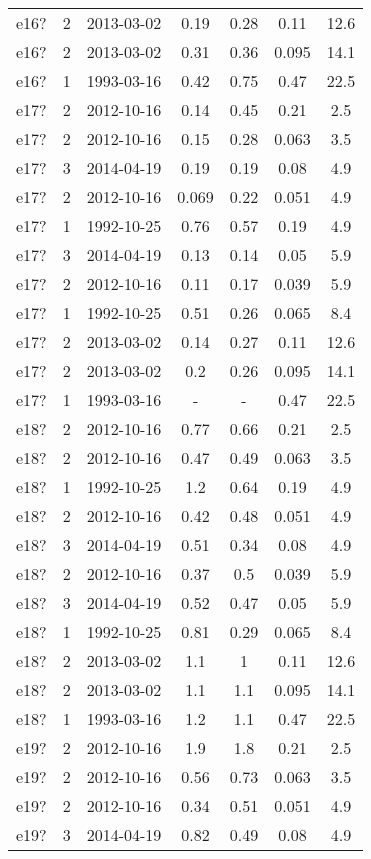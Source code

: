 \begin{longtable}[htp]
\begin{longtable}{ccccccc}
e16? & 2 & 2013-03-02 & 0.19 & 0.28 & 0.11 & 12.6 \\
e16? & 2 & 2013-03-02 & 0.31 & 0.36 & 0.095 & 14.1 \\
e16? & 1 & 1993-03-16 & 0.42 & 0.75 & 0.47 & 22.5 \\
e17? & 2 & 2012-10-16 & 0.14 & 0.45 & 0.21 & 2.5 \\
e17? & 2 & 2012-10-16 & 0.15 & 0.28 & 0.063 & 3.5 \\
e17? & 3 & 2014-04-19 & 0.19 & 0.19 & 0.08 & 4.9 \\
e17? & 2 & 2012-10-16 & 0.069 & 0.22 & 0.051 & 4.9 \\
e17? & 1 & 1992-10-25 & 0.76 & 0.57 & 0.19 & 4.9 \\
e17? & 3 & 2014-04-19 & 0.13 & 0.14 & 0.05 & 5.9 \\
e17? & 2 & 2012-10-16 & 0.11 & 0.17 & 0.039 & 5.9 \\
e17? & 1 & 1992-10-25 & 0.51 & 0.26 & 0.065 & 8.4 \\
e17? & 2 & 2013-03-02 & 0.14 & 0.27 & 0.11 & 12.6 \\
e17? & 2 & 2013-03-02 & 0.2 & 0.26 & 0.095 & 14.1 \\
e17? & 1 & 1993-03-16 & - & - & 0.47 & 22.5 \\
e18? & 2 & 2012-10-16 & 0.77 & 0.66 & 0.21 & 2.5 \\
e18? & 2 & 2012-10-16 & 0.47 & 0.49 & 0.063 & 3.5 \\
e18? & 1 & 1992-10-25 & 1.2 & 0.64 & 0.19 & 4.9 \\
e18? & 2 & 2012-10-16 & 0.42 & 0.48 & 0.051 & 4.9 \\
e18? & 3 & 2014-04-19 & 0.51 & 0.34 & 0.08 & 4.9 \\
e18? & 2 & 2012-10-16 & 0.37 & 0.5 & 0.039 & 5.9 \\
e18? & 3 & 2014-04-19 & 0.52 & 0.47 & 0.05 & 5.9 \\
e18? & 1 & 1992-10-25 & 0.81 & 0.29 & 0.065 & 8.4 \\
e18? & 2 & 2013-03-02 & 1.1 & 1 & 0.11 & 12.6 \\
e18? & 2 & 2013-03-02 & 1.1 & 1.1 & 0.095 & 14.1 \\
e18? & 1 & 1993-03-16 & 1.2 & 1.1 & 0.47 & 22.5 \\
e19? & 2 & 2012-10-16 & 1.9 & 1.8 & 0.21 & 2.5 \\
e19? & 2 & 2012-10-16 & 0.56 & 0.73 & 0.063 & 3.5 \\
e19? & 2 & 2012-10-16 & 0.34 & 0.51 & 0.051 & 4.9 \\
e19? & 3 & 2014-04-19 & 0.82 & 0.49 & 0.08 & 4.9 \\

\end{longtable}
\end{longtable}
